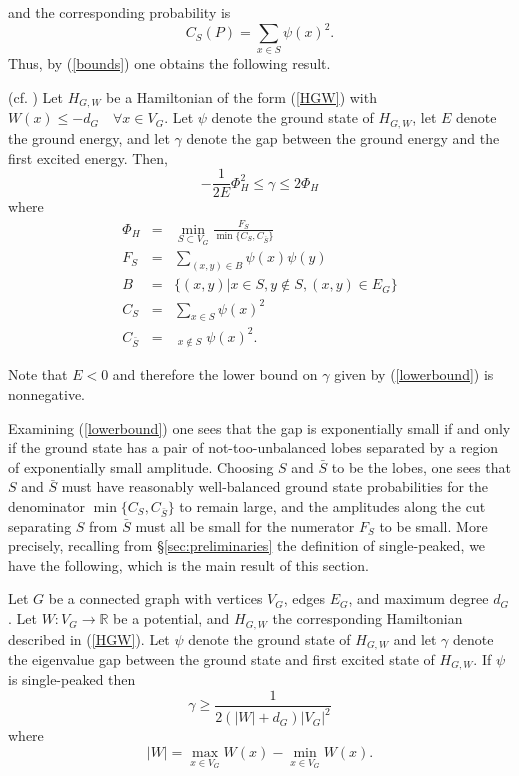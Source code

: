 and the corresponding probability is
\begin{equation}
C_S(P) = \sum_{x \in S} \psi(x)^2.
\end{equation}
Thus, by (\ref{bounds}) one obtains the following result.
\begin{lem}
\label{mainlemma}(cf. \cite{ATS03, BT09, AP10})
Let $H_{G,W}$ be a Hamiltonian of the form (\ref{HGW}) with $W(x) \leq
-d_G \quad \forall x \in V_G$. Let $\psi$ denote the ground state of
$H_{G,W}$, let $E$ denote the ground energy, and let $\gamma$ denote
the gap between the ground energy and the first excited energy. Then,
\begin{equation}
\label{lowerbound}
 - \frac{1}{2E} \Phi_H^2 \leq \gamma \leq 2 \Phi_H
\end{equation}
where
\begin{eqnarray}
\Phi_H & = & \min_{S \subset V_G} \frac{F_S}{\min
    \{C_S, C_{\bar{S}}\} } \\
F_S & = & \sum_{(x,y) \in B} \psi(x) \psi(y) \label{ar1}\\
B   & = & \{(x,y)| x \in S, y \notin S, (x,y) \in E_G\} \label{ar2}\\
C_S & = & \sum_{x \in S} \psi(x)^2 \label{ar3}\\
C_{\bar{S}} & = & \mathop{\sum_{x \in V_G}}_{x \notin S} \psi(x)^2. \label{ar4}
\end{eqnarray}
\end{lem}
\noindent
Note that $E < 0$ and therefore the lower bound on $\gamma$ given by
(\ref{lowerbound}) is nonnegative.

Examining (\ref{lowerbound}) one sees that the gap is exponentially
small if and only if the ground state has a pair of 
not-too-unbalanced lobes separated by a region of exponentially small
amplitude. Choosing $S$ and $\bar{S}$ to be the lobes, one sees that
$S$ and $\bar{S}$ must have reasonably well-balanced ground state
probabilities for the denominator $\min\{C_S, C_{\bar{S}}\}$ to remain
large, and the amplitudes along the cut separating $S$ from $\bar{S}$
must all be small for the numerator $F_S$ to be small. More precisely,
recalling from \S \ref{sec:preliminaries} the definition of
single-peaked, we have the following, which is the main result of this
section.

\begin{lem}
\label{mainprop}
Let $G$ be a connected graph with vertices $V_G$, edges $E_G$, and
maximum degree $d_G$. Let $W:V_G \to \mathbb{R}$ be a potential, and
$H_{G,W}$ the corresponding Hamiltonian described in (\ref{HGW}). Let
$\psi$ denote the ground state of $H_{G,W}$ and let $\gamma$ denote
the eigenvalue gap between the ground state and first excited state of
$H_{G,W}$. If $\psi$ is single-peaked then
\begin{equation}
\gamma \geq \frac{1}{2 (|W|+d_G) |V_G|^2}
\end{equation}
where
\begin{equation}
|W| = \max_{x \in V_G} W(x) - \min_{x \in V_G} W(x).
\end{equation}
\end{lem}

